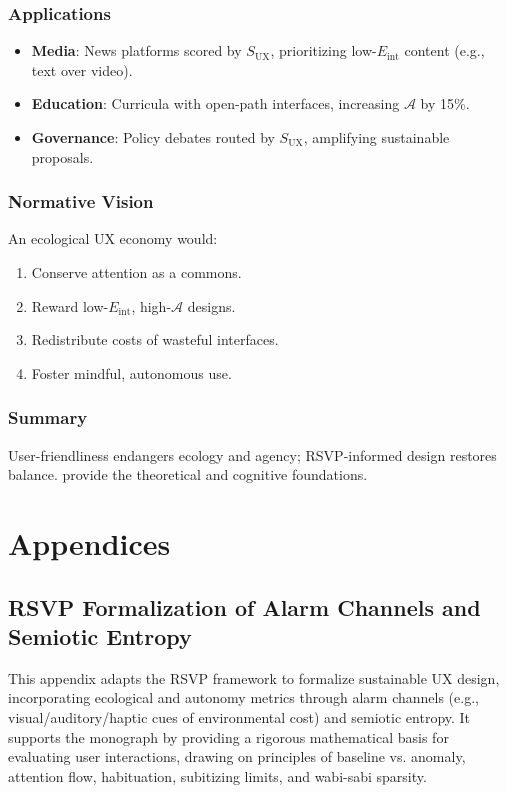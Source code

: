 \documentclass[openany]{book}
\newcommand{\Eint}{E_{\mathrm{int}}} %
\newcommand{\Auton}{\mathcal{A}} %
\newcommand{\SUX}{S_{\mathrm{UX}}} %
\begin{document}
\section{Applications}
\label{sec:vision-apps}
\begin{itemize}
  \item \textbf{Media}: News platforms scored by $\SUX$, prioritizing low-$\Eint$ content (e.g., text over video).
  \item \textbf{Education}: Curricula with open-path interfaces, increasing $\Auton$ by 15\%.
  \item \textbf{Governance}: Policy debates routed by $\SUX$, amplifying sustainable proposals.
\end{itemize}

\section{Normative Vision}
\label{sec:vision-normative}
An ecological UX economy would:
\begin{enumerate}
  \item Conserve attention as a commons.
  \item Reward low-$\Eint$, high-$\Auton$ designs.
  \item Redistribute costs of wasteful interfaces.
  \item Foster mindful, autonomous use.
\end{enumerate}

\section{Summary}
User-friendliness endangers ecology and agency; RSVP-informed design restores balance.  provide the theoretical and cognitive foundations.

\part{Appendices}

\appendix
\chapter{RSVP Formalization of Alarm Channels and Semiotic Entropy}
\label{app:rsvp}

This appendix adapts the RSVP framework to formalize sustainable UX design, incorporating ecological and autonomy metrics through alarm channels (e.g., visual/auditory/haptic cues of environmental cost) and semiotic entropy. It supports the monograph by providing a rigorous mathematical basis for evaluating user interactions, drawing on principles of baseline vs. anomaly, attention flow, habituation, subitizing limits, and wabi-sabi sparsity.
\end{document}
